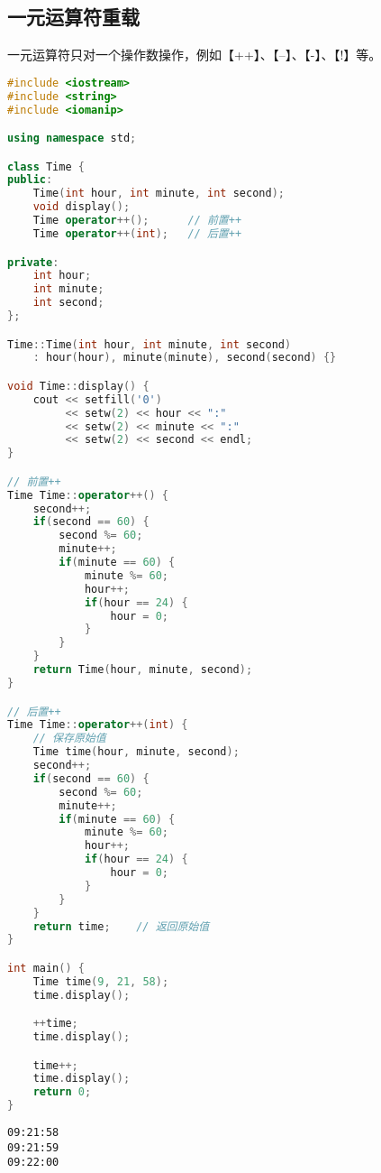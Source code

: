 \vspace{0.5cm}

\subsection{一元运算符重载}

一元运算符只对一个操作数操作，例如【++】、【--】、【-】、【!】等。\\


\begin{lstlisting}[language=C++]
#include <iostream>
#include <string>
#include <iomanip>

using namespace std;

class Time {
public:
    Time(int hour, int minute, int second);
    void display();
    Time operator++();      // 前置++
    Time operator++(int);   // 后置++

private:
    int hour;
    int minute;
    int second;
};

Time::Time(int hour, int minute, int second) 
    : hour(hour), minute(minute), second(second) {}

void Time::display() {
    cout << setfill('0')
         << setw(2) << hour << ":"
         << setw(2) << minute << ":"
         << setw(2) << second << endl;
}

// 前置++
Time Time::operator++() {
    second++;
    if(second == 60) {
        second %= 60;
        minute++;
        if(minute == 60) {
            minute %= 60;
            hour++;
            if(hour == 24) {
                hour = 0;
            }
        }
    }
    return Time(hour, minute, second);
}

// 后置++
Time Time::operator++(int) {
    // 保存原始值
    Time time(hour, minute, second);
    second++;
    if(second == 60) {
        second %= 60;
        minute++;
        if(minute == 60) {
            minute %= 60;
            hour++;
            if(hour == 24) {
                hour = 0;
            }
        }
    }
    return time;    // 返回原始值
}

int main() {
    Time time(9, 21, 58);
    time.display();

    ++time;
    time.display();

    time++;
    time.display();
    return 0;
}
\end{lstlisting}

\begin{tcolorbox}
	\begin{verbatim}
09:21:58
09:21:59
09:22:00
	\end{verbatim}
\end{tcolorbox}

